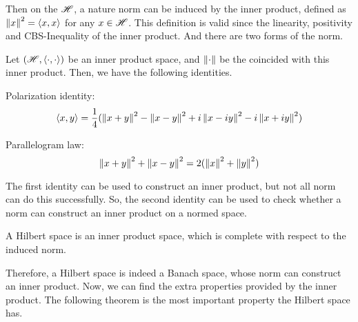 \documentclass[a4paper,11pt]{report}
\begin{document}
Then on the $\mathscr{H}$, a nature norm can be induced by the inner product, defined as $\left\lVert x\right\lVert^{2}= \langle x,x \rangle$ for any $x \in \mathscr{H}$. This definition is valid since the linearity, positivity and CBS-Inequality of the inner product. And there are two forms of the norm.

\begin{prop}
	Let $(\mathscr{H}, \langle \cdot,\cdot \rangle)$ be an inner product space, and $\left\lVert\cdot\right\lVert$ be the coincided with this inner product. Then, we have the following identities.
	\item Polarization identity: 
	\begin{equation*}
		 \langle x,y \rangle = \frac{1}{4}(\left\lVert x+y\right\lVert^{2}-\left\lVert x-y\right\lVert^{2}+i\left\lVert x-iy\right\lVert^{2}-i\left\lVert x+iy\right\lVert^{2})
	\end{equation*}
	\item Parallelogram law:
	\begin{equation*}
		\left\lVert x+y\right\lVert^{2}+\left\lVert x-y\right\lVert^{2} = 2(\left\lVert x\right\lVert^{2}+\left\lVert y\right\lVert^{2})
	\end{equation*}
\end{prop}
\begin{rem}
	The first identity can be used to construct an inner product, but not all norm can do this successfully. So, the second identity can be used to check whether a norm can construct an inner product on a normed space.
\end{rem}

\begin{defn}
	A Hilbert space is an inner product space, which is complete with respect to the induced norm.
\end{defn}

Therefore, a Hilbert space is indeed a Banach space, whose norm can construct an inner product. Now, we can find the extra properties provided by the inner product. The following theorem is the most important property the Hilbert space has.
\end{document}
